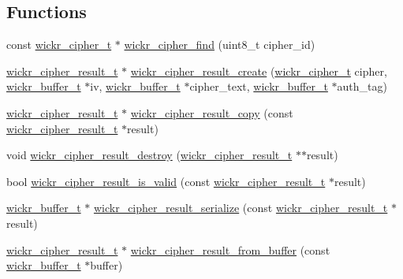 \subsection*{Functions}
\begin{DoxyCompactItemize}
\item 
const \hyperlink{structwickr__cipher}{wickr\+\_\+cipher\+\_\+t} $\ast$ \hyperlink{group__wickr__cipher_ga2b7a8bc33e1fd5af61763398ea9a4013}{wickr\+\_\+cipher\+\_\+find} (uint8\+\_\+t cipher\+\_\+id)
\item 
\hyperlink{structwickr__cipher__result}{wickr\+\_\+cipher\+\_\+result\+\_\+t} $\ast$ \hyperlink{group__wickr__cipher_ga234b60967d0b3ef0088ca3ac30755dde}{wickr\+\_\+cipher\+\_\+result\+\_\+create} (\hyperlink{structwickr__cipher}{wickr\+\_\+cipher\+\_\+t} cipher, \hyperlink{structwickr__buffer}{wickr\+\_\+buffer\+\_\+t} $\ast$iv, \hyperlink{structwickr__buffer}{wickr\+\_\+buffer\+\_\+t} $\ast$cipher\+\_\+text, \hyperlink{structwickr__buffer}{wickr\+\_\+buffer\+\_\+t} $\ast$auth\+\_\+tag)
\item 
\hyperlink{structwickr__cipher__result}{wickr\+\_\+cipher\+\_\+result\+\_\+t} $\ast$ \hyperlink{group__wickr__cipher_gace82050fcc8b7932df9a9e8109a2fc1d}{wickr\+\_\+cipher\+\_\+result\+\_\+copy} (const \hyperlink{structwickr__cipher__result}{wickr\+\_\+cipher\+\_\+result\+\_\+t} $\ast$result)
\item 
void \hyperlink{group__wickr__cipher_gad5d22ca53abc4397d88040f0f8003021}{wickr\+\_\+cipher\+\_\+result\+\_\+destroy} (\hyperlink{structwickr__cipher__result}{wickr\+\_\+cipher\+\_\+result\+\_\+t} $\ast$$\ast$result)
\item 
bool \hyperlink{group__wickr__cipher_ga3f1b679c199987148952816b6fc4c009}{wickr\+\_\+cipher\+\_\+result\+\_\+is\+\_\+valid} (const \hyperlink{structwickr__cipher__result}{wickr\+\_\+cipher\+\_\+result\+\_\+t} $\ast$result)
\item 
\hyperlink{structwickr__buffer}{wickr\+\_\+buffer\+\_\+t} $\ast$ \hyperlink{group__wickr__cipher_gacda386115dc52f83a0518f8ac0dad6a2}{wickr\+\_\+cipher\+\_\+result\+\_\+serialize} (const \hyperlink{structwickr__cipher__result}{wickr\+\_\+cipher\+\_\+result\+\_\+t} $\ast$result)
\item 
\hyperlink{structwickr__cipher__result}{wickr\+\_\+cipher\+\_\+result\+\_\+t} $\ast$ \hyperlink{group__wickr__cipher_gad42314812c457855c3799632494c91a7}{wickr\+\_\+cipher\+\_\+result\+\_\+from\+\_\+buffer} (const \hyperlink{structwickr__buffer}{wickr\+\_\+buffer\+\_\+t} $\ast$buffer)
\item 
$$
\end{DoxyCompactItemize}
